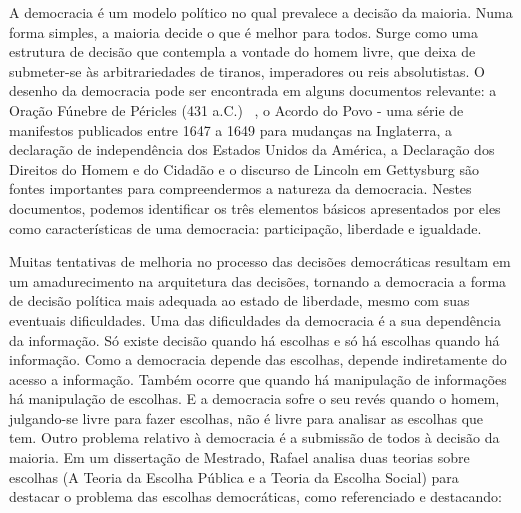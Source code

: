 


A democracia é um modelo político no qual prevalece a decisão da maioria. Numa forma simples, a maioria decide o que é melhor para todos. Surge como uma estrutura de decisão que contempla a vontade do homem livre, que deixa de submeter-se às arbitrariedades de tiranos, imperadores ou reis absolutistas. O desenho da democracia pode ser encontrada em alguns documentos relevante: a Oração Fúnebre de Péricles (431 a.C.)~ \cite{oracaoPericles}, o Acordo do Povo - uma série de manifestos publicados entre 1647 a 1649 para mudanças na Inglaterra, a declaração de independência dos Estados Unidos da América, a Declaração dos Direitos do Homem e do Cidadão e o discurso de Lincoln em Gettysburg são fontes importantes para compreendermos a natureza da democracia. Nestes documentos, podemos identificar  os três elementos básicos apresentados por eles como características de uma democracia: participação, liberdade e igualdade.

Muitas tentativas de melhoria no processo das decisões democráticas resultam em um amadurecimento na arquitetura das decisões, tornando a democracia a forma de decisão política mais adequada ao estado de liberdade, mesmo com suas eventuais dificuldades. Uma das dificuldades da democracia é a sua dependência da informação. Só existe decisão quando há escolhas e só há escolhas quando há informação. Como a democracia depende das escolhas, depende indiretamente do acesso a informação. Também ocorre que quando há manipulação de informações há manipulação de escolhas. E a democracia sofre o seu revés quando o homem, julgando-se livre para fazer escolhas, não é livre para analisar as escolhas que tem. 
Outro problema relativo à democracia é a submissão de todos à decisão da maioria. Em um dissertação de Mestrado, Rafael  analisa duas teorias sobre escolhas (A Teoria da Escolha Pública e a Teoria da Escolha Social) para destacar o problema das escolhas democráticas, como referenciado e destacando:

